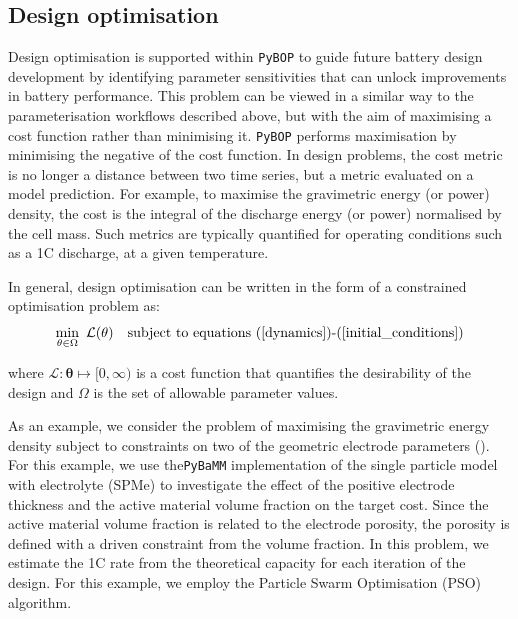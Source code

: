 \documentclass[
]{article}
\begin{document}
\subsection{Design optimisation}\label{design-optimisation}

Design optimisation is supported within \texttt{PyBOP} to guide future
battery design development by identifying parameter sensitivities that
can unlock improvements in battery performance. This problem can be
viewed in a similar way to the parameterisation workflows described
above, but with the aim of maximising a cost function rather than
minimising it. \texttt{PyBOP} performs maximisation by minimising the
negative of the cost function. In design problems, the cost metric is no
longer a distance between two time series, but a metric evaluated on a
model prediction. For example, to maximise the gravimetric energy (or
power) density, the cost is the integral of the discharge energy (or
power) normalised by the cell mass. Such metrics are typically
quantified for operating conditions such as a 1C discharge, at a given
temperature.

In general, design optimisation can be written in the form of a
constrained optimisation problem as: \begin{equation}
\min_{\mathbf{\theta} \in \Omega} ~ \mathcal{L}(\mathbf{\theta}) ~~~
\textrm{subject to equations (\ref{dynamics})\textrm{-}(\ref{initial_conditions})}
\label{eqn:design}
\end{equation}

where \(\mathcal{L} : \mathbf{\theta} \mapsto [0,\infty)\) is a cost
function that quantifies the desirability of the design and \(\Omega\)
is the set of allowable parameter values.

As an example, we consider the problem of maximising the gravimetric
energy density subject to constraints on two of the geometric electrode
parameters (). For this
example, we use the\texttt{PyBaMM} implementation of the single particle
model with electrolyte (SPMe) to investigate the effect of the positive
electrode thickness and the active material volume fraction on the
target cost. Since the active material volume fraction is related to the
electrode porosity, the porosity is defined with a driven constraint
from the volume fraction. In this problem, we estimate the 1C rate from
the theoretical capacity for each iteration of the design. For this
example, we employ the Particle Swarm Optimisation (PSO) algorithm.
\end{document}
